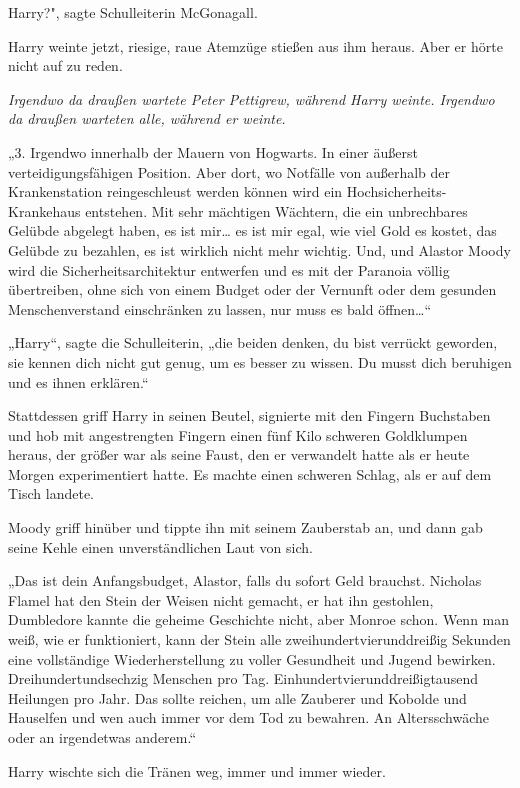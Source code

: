 {Harry?", sagte Schulleiterin McGonagall.

Harry weinte jetzt, riesige, raue Atemzüge stießen aus ihm heraus. Aber er hörte nicht auf zu reden.

\emph{Irgendwo da draußen wartete Peter Pettigrew, während Harry weinte. Irgendwo da draußen warteten alle, während er weinte.}

„3. Irgendwo innerhalb der Mauern von Hogwarts. In einer äußerst verteidigungsfähigen Position. Aber dort, wo Notfälle von außerhalb der Krankenstation reingeschleust werden können wird ein Hochsicherheits-Krankehaus entstehen. Mit sehr mächtigen Wächtern, die ein unbrechbares Gelübde abgelegt haben, es ist mir… es ist mir egal, wie viel Gold es kostet, das Gelübde zu bezahlen, es ist wirklich nicht mehr wichtig. Und, und Alastor Moody wird die Sicherheitsarchitektur entwerfen und es mit der Paranoia völlig übertreiben, ohne sich von einem Budget oder der Vernunft oder dem gesunden Menschenverstand einschränken zu lassen, nur muss es bald öffnen…“

„Harry“, sagte die Schulleiterin, „die beiden denken, du bist verrückt geworden, sie kennen dich nicht gut genug, um es besser zu wissen. Du musst dich beruhigen und es ihnen erklären.“

Stattdessen griff Harry in seinen Beutel, signierte mit den Fingern Buchstaben und hob mit angestrengten Fingern einen fünf Kilo schweren Goldklumpen heraus, der größer war als seine Faust, den er verwandelt hatte als er heute Morgen experimentiert hatte. Es machte einen schweren Schlag, als er auf dem Tisch landete.

Moody griff hinüber und tippte ihn mit seinem Zauberstab an, und dann gab seine Kehle einen unverständlichen Laut von sich.

„Das ist dein Anfangsbudget, Alastor, falls du sofort Geld brauchst. Nicholas Flamel hat den Stein der Weisen nicht gemacht, er hat ihn gestohlen, Dumbledore kannte die geheime Geschichte nicht, aber Monroe schon. Wenn man weiß, wie er funktioniert, kann der Stein alle zweihundertvierunddreißig Sekunden eine vollständige Wiederherstellung zu voller Gesundheit und Jugend bewirken. Dreihundertundsechzig Menschen pro Tag. Einhundertvierunddreißigtausend Heilungen pro Jahr. Das sollte reichen, um alle Zauberer und Kobolde und Hauselfen und wen auch immer vor dem Tod zu bewahren. An Altersschwäche oder an irgendetwas anderem.“

Harry wischte sich die Tränen weg, immer und immer wieder.

}
